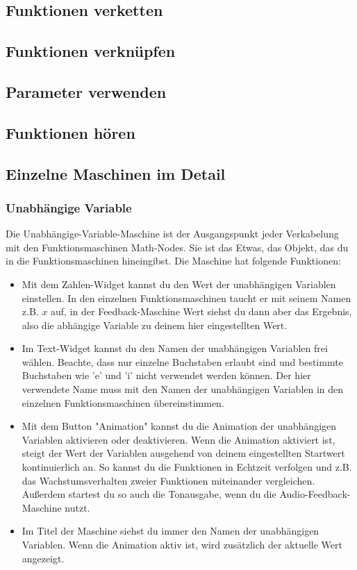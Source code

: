 \documentclass[12pt]{report}
\begin{document}
\subsection{Funktionen verketten}
\subsection{Funktionen verknüpfen}
\subsection{Parameter verwenden}
\subsection{Funktionen hören}
\subsection{Einzelne Maschinen im Detail}
\subsubsection{Unabhängige Variable}
Die Unabhängige-Variable-Maschine ist der Ausgangspunkt jeder Verkabelung mit den Funktionsmaschinen Math-Nodes. Sie ist das Etwas, das Objekt, das du in die Funktionsmaschinen hineingibst. Die Maschine hat folgende Funktionen:

\begin{itemize}
    \item {} Mit dem Zahlen-Widget kannst du den Wert der unabhängigen Variablen einstellen. In den einzelnen Funktionsmaschinen taucht er mit seinem Namen z.B. $x$ auf, in der Feedback-Maschine Wert siehst du dann aber das Ergebnis, also die abhängige Variable zu deinem hier eingestellten Wert.
    
    \item {} Im Text-Widget kannst du den Namen der unabhängigen Variablen frei wählen. Beachte, dass nur einzelne Buchstaben erlaubt sind und bestimmte Buchstaben wie 'e' und 'i' nicht verwendet werden können. Der hier verwendete Name muss mit den Namen der unabhängigen Variablen in den einzelnen Funktionsmaschinen übereinstimmen.
    
    \item {} Mit dem Button "Animation" kannst du die Animation der unabhängigen Variablen aktivieren oder deaktivieren. Wenn die Animation aktiviert ist, steigt der Wert der Variablen ausgehend von deinem eingestellten Startwert kontinuierlich an. So kannst du die Funktionen in Echtzeit verfolgen und z.B. das Wachstumsverhalten zweier Funktionen miteinander vergleichen. Außerdem startest du so auch die Tonausgabe, wenn du die Audio-Feedback-Maschine nutzt.
    
    \item {} Im Titel der Maschine siehst du immer den Namen der unabhängigen Variablen. Wenn die Animation aktiv ist, wird zusätzlich der aktuelle Wert angezeigt.
\end{itemize}
\end{document}
